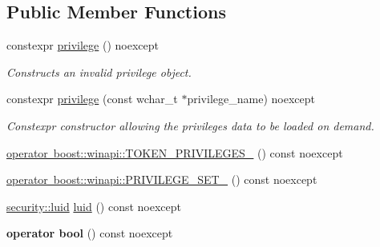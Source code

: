 \subsection*{Public Member Functions}
\begin{DoxyCompactItemize}
\item 
\mbox{\label{classdistant_1_1security_1_1privilege_ad56794753d4ae10d25e250447b780dfd}} 
constexpr \mbox{\hyperlink{classdistant_1_1security_1_1privilege_ad56794753d4ae10d25e250447b780dfd}{privilege}} () noexcept
\begin{DoxyCompactList}\small\item\em Constructs an invalid privilege object. \end{DoxyCompactList}\item 
\mbox{\label{classdistant_1_1security_1_1privilege_a80bf48ca0eaa99021224e8c4b706342d}} 
constexpr \mbox{\hyperlink{classdistant_1_1security_1_1privilege_a80bf48ca0eaa99021224e8c4b706342d}{privilege}} (const wchar\+\_\+t $\ast$privilege\+\_\+name) noexcept
\begin{DoxyCompactList}\small\item\em Constexpr constructor allowing the privilege\textquotesingle{}s data to be loaded on demand. \end{DoxyCompactList}\item 
\mbox{\hyperlink{classdistant_1_1security_1_1privilege_a6e2459e68912b91a2480c8610c6cf583}{operator boost\+::winapi\+::\+T\+O\+K\+E\+N\+\_\+\+P\+R\+I\+V\+I\+L\+E\+G\+E\+S\+\_\+}} () const noexcept
\item 
\mbox{\hyperlink{classdistant_1_1security_1_1privilege_ab03490c45a7706a1872a8d3aacdf5793}{operator boost\+::winapi\+::\+P\+R\+I\+V\+I\+L\+E\+G\+E\+\_\+\+S\+E\+T\+\_\+}} () const noexcept
\item 
\mbox{\hyperlink{structboost_1_1winapi_1_1___l_u_i_d__}{security\+::luid}} \mbox{\hyperlink{classdistant_1_1security_1_1privilege_a853ad254c23e6518a259d74e33836040}{luid}} () const noexcept
\item 
\mbox{\label{classdistant_1_1security_1_1privilege_ad03d6c7a739815d805b5225a3145d5f2}} 
{\bfseries operator bool} () const noexcept
\end{DoxyCompactItemize}


